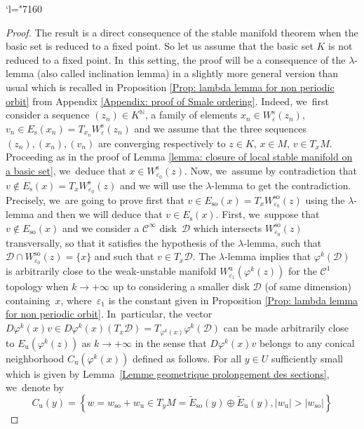 \documentclass[JEP,XML,SOM,Unicode,NoEqCountersInSection,NoFloatCountersInSection,published]{cedram}
\newcommand{\Changel}{\mathcode`l="7160}
\newcommand{\rs}{\mathrm{s}}
\newcommand{\rso}{\mathrm{so}}
\newcommand{\ru}{\mathrm{u}}
\theoremstyle{definition}
\theoremstyle{plain}
\newcommand{\Ccal}{\mathcal{C}}
\newcommand{\D}{\mathcal{D}}
\newcommand{\N}{\mathbb{N}}
\begin{document}
\Changel
\begin{proof}
The result is a direct consequence of the stable manifold theorem when the basic set is reduced to a fixed point. So let us assume that the basic set $K$ is not reduced to a fixed point. In~this setting, the proof will be a consequence of the $\lambda$-lemma (also called inclination lemma) in a slightly more general version than usual which is recalled in Proposition \ref{Prop: lambda lemma for non periodic orbit} from Appendix \ref{Appendix: proof of Smale ordering}. Indeed, we~first consider a sequence $(z_n) \in K^{\N}$, a family of elements $x_n \in W_{\varepsilon}^\rs (z_n)$, $v_n \in E_\rs (x_n) = T_{x_n} W_{\varepsilon}^\rs (z_n)$ and we assume that the three sequences $(z_n),(x_n),(v_n)$ are converging respectively to $z \in K$, $x \in M$, $v \in T_x M$. Proceeding as in the proof of Lemma \ref{lemma: closure of local stable manifold on a basic set}, we~deduce that $x \in W_{\varepsilon_0}^\rs (z)$. Now, we~assume by contradiction that $v \notin E_\rs (x) = T_x W_{\varepsilon_0}^\rs (z)$ and we will use the $\lambda$-lemma to get the contradiction. Precisely, we~are going to prove first that $v \in E_{\rso} (x) = T_x W_{\varepsilon_0}^{\rso} (z)$ using the $\lambda$-lemma and then we will deduce that $v \in E_\rs (x)$. First, we~suppose that $v \notin E_{\rso}(x)$ and we consider a $\Ccal^{\infty}$ disk~$\D$ which intersects $W_{\varepsilon_0}^{\rso} (z)$ transversally, so that it satisfies the hypothesis of the $\lambda$\nobreakdash-lemma, such that \hbox{$\D \cap W_{\varepsilon_0}^{\rso} (z) = \{x\}$} and such that $v \in T_x \D$. The $\lambda$-lemma implies that $\varphi^k \left(\D \right)$ is arbitrarily close to the weak-unstable manifold $W_{\varepsilon_1}^{\ru} (\varphi^k (z))$ for the $\Ccal^1$ topology when $k \to +\infty$ up to considering a smaller disk $\D$ (of same dimension) containing~$x$, where~$\varepsilon_1$ is the constant given in Proposition \ref{Prop: lambda lemma for non periodic orbit}. In~particular, the vector $D \varphi^k (x)v \in D \varphi^k (x) \left(T_x \D \right) = T_{\varphi^k (x)} \varphi^k \left(\D \right)$ can be made arbitrarily close to $E_{\ru} (\varphi^k (z))$ as $k \to + \infty$ in the sense that $D \varphi^k (x)v$ belongs to any conical neighborhood $C_{\ru} (\varphi^k (x))$ defined as follows. For all $y \in U$ sufficiently small which is given by Lemma~\ref{Lemme geometrique prolongement des sections}, we~denote by
\[
C_{\ru} (y) = \left\{w = w_{\rso} + w_{\ru} \in T_y M =\widetilde{E}_{\rso} (y) \oplus \widetilde{E}_{\ru} (y), |w_{\ru}| > |w_{\rso}| \right\}
\]
\end{proof}
\end{document}
